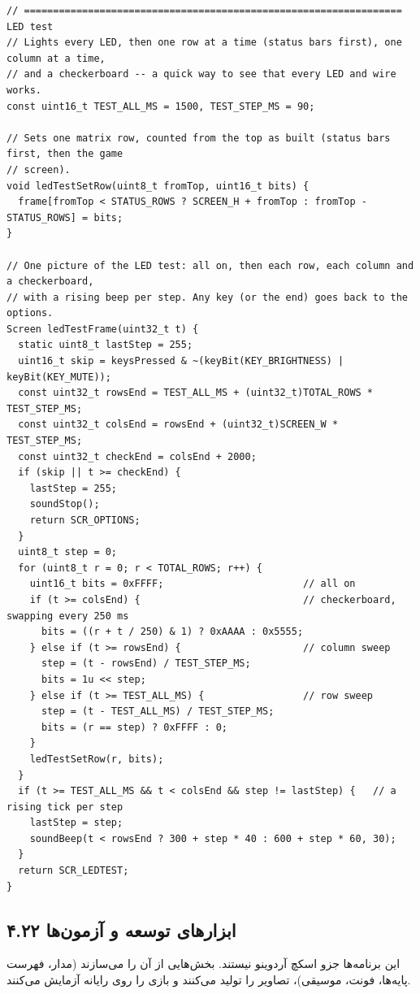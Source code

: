 \documentclass[11pt,a4paper]{article}
\begin{document}
\begin{latin}
\begin{lstlisting}[language=Arduino]
// ================================================================= LED test
// Lights every LED, then one row at a time (status bars first), one column at a time,
// and a checkerboard -- a quick way to see that every LED and wire works.
const uint16_t TEST_ALL_MS = 1500, TEST_STEP_MS = 90;

// Sets one matrix row, counted from the top as built (status bars first, then the game
// screen).
void ledTestSetRow(uint8_t fromTop, uint16_t bits) {
  frame[fromTop < STATUS_ROWS ? SCREEN_H + fromTop : fromTop - STATUS_ROWS] = bits;
}

// One picture of the LED test: all on, then each row, each column and a checkerboard,
// with a rising beep per step. Any key (or the end) goes back to the options.
Screen ledTestFrame(uint32_t t) {
  static uint8_t lastStep = 255;
  uint16_t skip = keysPressed & ~(keyBit(KEY_BRIGHTNESS) | keyBit(KEY_MUTE));
  const uint32_t rowsEnd = TEST_ALL_MS + (uint32_t)TOTAL_ROWS * TEST_STEP_MS;
  const uint32_t colsEnd = rowsEnd + (uint32_t)SCREEN_W * TEST_STEP_MS;
  const uint32_t checkEnd = colsEnd + 2000;
  if (skip || t >= checkEnd) {
    lastStep = 255;
    soundStop();
    return SCR_OPTIONS;
  }
  uint8_t step = 0;
  for (uint8_t r = 0; r < TOTAL_ROWS; r++) {
    uint16_t bits = 0xFFFF;                        // all on
    if (t >= colsEnd) {                            // checkerboard, swapping every 250 ms
      bits = ((r + t / 250) & 1) ? 0xAAAA : 0x5555;
    } else if (t >= rowsEnd) {                     // column sweep
      step = (t - rowsEnd) / TEST_STEP_MS;
      bits = 1u << step;
    } else if (t >= TEST_ALL_MS) {                 // row sweep
      step = (t - TEST_ALL_MS) / TEST_STEP_MS;
      bits = (r == step) ? 0xFFFF : 0;
    }
    ledTestSetRow(r, bits);
  }
  if (t >= TEST_ALL_MS && t < colsEnd && step != lastStep) {   // a rising tick per step
    lastStep = step;
    soundBeep(t < rowsEnd ? 300 + step * 40 : 600 + step * 60, 30);
  }
  return SCR_LEDTEST;
}
\end{lstlisting}

\end{latin}

\clearpage
\subsection*{۴.۲۲ ابزارهای توسعه و آزمون‌ها}
این برنامه‌ها جزو اسکچ آردوینو نیستند. بخش‌هایی از آن را می‌سازند (مدار، فهرست پایه‌ها، فونت، موسیقی)، تصاویر را تولید می‌کنند و بازی را روی رایانه آزمایش می‌کنند.
\end{document}
